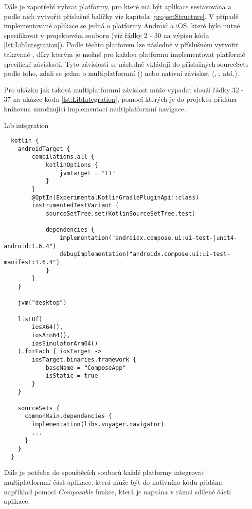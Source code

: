 Dále je zapotřebí vybrat platformy, pro které má být aplikace sestavována a podle nich vytvořit příslušné balíčky viz kapitola \ref{projectStructure}.
V případě implementované aplikace se jedná o platformy Android a iOS, které bylo nutné specifikovat v projektovém souboru 
 (viz řádky 2 - 30 na výpisu kódu \ref{lst:LibIntegration}).
Podle těchto platforem lze následně v příslušném  vytvořit takzvané , díky kterým je možné
pro každou platformu implementovat platformě specifické závislosti. Tyto závislosti se následně vkládají do příslušných
sourceSets podle toho, zdali se jedna o multiplatformní () nebo nativní závislost (, , atd.).

Pro ukázku jak taková multiplatformní závislost může vypadat slouží řádky 32 - 37 na ukázce kódu \ref{lst:LibIntegration}, pomocí 
kterých je do projektu přidána knihovna umožnující implementaci multiplatformní navigace.
\begin{listing}
\caption{Lib integration}\label{lst:LibIntegration}
\begin{verbatim}
  kotlin {
    androidTarget {
        compilations.all {
            kotlinOptions {
                jvmTarget = "11"
            }
        }
        @OptIn(ExperimentalKotlinGradlePluginApi::class)
        instrumentedTestVariant {
            sourceSetTree.set(KotlinSourceSetTree.test)

            dependencies {
                implementation("androidx.compose.ui:ui-test-junit4-android:1.6.4")
                debugImplementation("androidx.compose.ui:ui-test-manifest:1.6.4")
            }
        }
    }

    jvm("desktop")

    listOf(
        iosX64(),
        iosArm64(),
        iosSimulatorArm64()
    ).forEach { iosTarget ->
        iosTarget.binaries.framework {
            baseName = "ComposeApp"
            isStatic = true
        }
    }

    sourceSets {
      commonMain.dependencies {
        implementation(libs.voyager.navigator)
        ...
      }
    }
  }  
\end{verbatim}
\end{listing}

Dále je potřeba do spouštěcích souborů každé platformy integrovat multiplatformní část aplikace, která může být do nativního kódu přidána
například pomocí \textit{Composable} funkce, která je napsána v rámci sdílené části aplikace.

